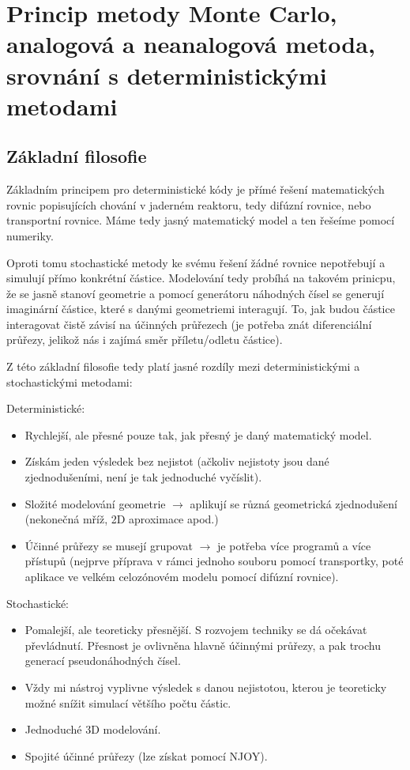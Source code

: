 \section[Monte-Carlo]{Princip metody Monte Carlo, analogová a neanalogová metoda, srovnání s deterministickými metodami}

\subsection{Základní filosofie}

Základním principem pro deterministické kódy je přímé řešení matematických rovnic popisujících chování v jaderném reaktoru, tedy difúzní rovnice, nebo transportní rovnice. Máme tedy jasný matematický model a ten řešeíme pomocí numeriky.

Oproti tomu stochastické metody ke svému řešení žádné rovnice nepotřebují a simulují přímo konkrétní částice. Modelování tedy probíhá na takovém prinicpu, že se jasně stanoví geometrie a pomocí generátoru náhodných čísel se generují imaginární částice, které s danými geometriemi interagují. To, jak budou částice interagovat čistě závisí na účinných průřezech (je potřeba znát diferenciální průřezy, jelikož nás i zajímá směr příletu/odletu částice). 

Z této základní filosofie tedy platí jasné rozdíly mezi deterministickými a stochastickými metodami:

Deterministické:
\begin{itemize}
  \item Rychlejší, ale přesné pouze tak, jak přesný je daný matematický model.
  \item Získám jeden výsledek bez nejistot (ačkoliv nejistoty jsou dané zjednodušeními, není je tak jednoduché vyčíslit).
  \item Složité modelování geometrie $\rightarrow$ aplikují se různá geometrická zjednodušení (nekonečná mříž, 2D aproximace apod.)
  \item Účinné průřezy se musejí grupovat $\rightarrow$ je potřeba více programů a více přístupů (nejprve příprava v rámci jednoho souboru pomocí transportky, poté aplikace ve velkém celozónovém modelu pomocí difúzní rovnice).
\end{itemize}

Stochastické:
\begin{itemize}
  \item Pomalejší, ale teoreticky přesnější. S rozvojem techniky se dá očekávat převládnutí. Přesnost je ovlivněna hlavně účinnými průřezy, a pak trochu generací pseudonáhodných čísel.
  \item Vždy mi nástroj vyplivne výsledek s danou nejistotou, kterou je teoreticky možné snížit simulací většího počtu částic.
  \item Jednoduché 3D modelování.
  \item Spojité účinné průřezy (lze získat pomocí NJOY).
\end{itemize}

